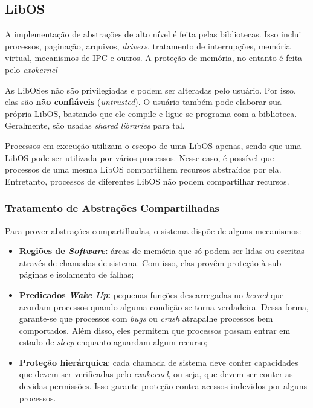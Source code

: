 \subsection{LibOS}
A implementação de abstrações de alto nível é feita pelas bibliotecas. Isso inclui processos, paginação, arquivos, \textit{drivers}, tratamento de interrupções, memória virtual, mecanismos de IPC e outros. A proteção de memória, no entanto é feita pelo \textit{exokernel}

As LibOSes não são privilegiadas e podem ser alteradas pelo usuário. Por isso, elas são \textbf{não confiáveis} (\textit{untrusted}). O usuário também pode elaborar sua própria LibOS, bastando que ele compile e ligue se programa com a biblioteca. Geralmente, são usadas \textit{shared libraries} para tal.

Processos em execução utilizam o escopo de uma LibOS apenas, sendo que uma LibOS pode ser utilizada por vários processos. Nesse caso, é possível que processos de uma mesma LibOS compartilhem recursos abstraídos por ela. Entretanto, processos de diferentes LibOS não podem compartilhar recursos.

\subsubsection{Tratamento de Abstrações Compartilhadas}
Para prover abstrações compartilhadas, o sistema dispõe de alguns mecanismos:

\begin{itemize}
  \item \textbf{Regiões de \textit{Software}:} áreas de memória que só podem ser lidas ou escritas através de chamadas de sistema. Com isso, elas provêm proteção à sub-páginas e isolamento de falhas;

  \item \textbf{Predicados \textit{Wake Up}:} pequenas funções descarregadas no \textit{kernel} que acordam processos quando alguma condição se torna verdadeira. Dessa forma, garante-se que processos com \textit{bugs} ou \textit{crash} atrapalhe processos bem comportados. Além disso, eles permitem que processos possam entrar em estado de \textit{sleep} enquanto aguardam algum recurso;

  \item \textbf{Proteção hierárquica}: cada chamada de sistema deve conter capacidades que devem ser verificadas pelo \textit{exokernel}, ou seja, que devem ser conter as devidas permissões. Isso garante proteção contra acessos indevidos por alguns processos.
\end{itemize}

